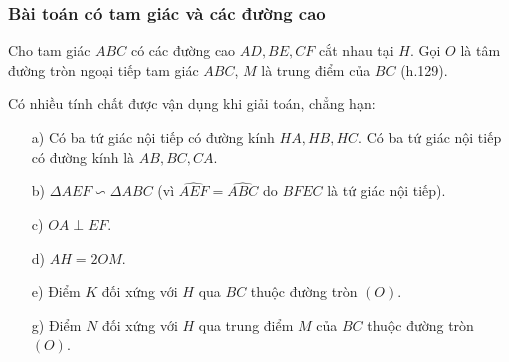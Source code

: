 \subsubsection{Bài toán có tam giác và các đường cao}
Cho tam giác $ABC$ có các đường cao $AD,BE,CF$ cắt nhau tại $H$. Gọi $O$ là tâm đường tròn ngoại tiếp tam giác $ABC$, $M$ là trung điểm của $BC$ (h.129).
\begin{center}
\end{center}
Có nhiều tính chất được vận dụng khi giải toán, chẳng hạn: 
\begin{enumerate}
	\item[a)] Có ba tứ giác nội tiếp có đường kính $HA,HB,HC$. Có ba tứ giác nội tiếp có đường kính là $AB,BC,CA$. 
	\item[b)] $\Delta AEF \backsim \Delta ABC$ (vì $\widehat{AEF} =\widehat{ABC}$ do $BFEC$ là tứ giác nội tiếp). 
	\item[c)] $OA \perp EF$. 
	\item[d)] $AH=2OM$. 
	\item[e)] Điểm $K$ đối xứng với $H$ qua $BC$ thuộc đường tròn $(O)$. 
	\item[g)] Điểm $N$ đối xứng với $H$ qua trung điểm $M$ của $BC$ thuộc đường tròn $(O)$.
\end{enumerate}

